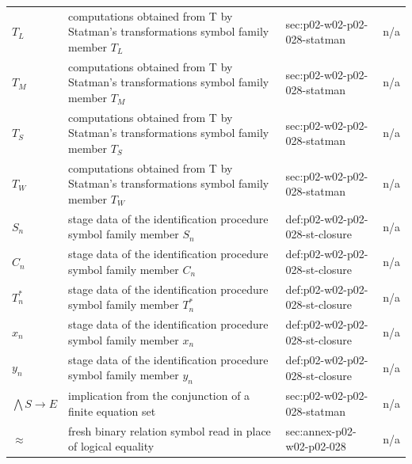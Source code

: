 \begin{longtable}{@{}p{}p{}p{}p{}@{}}
\(T_L\) & computations obtained from T by Statman's transformations symbol family member \(T_L\) & sec:\allowbreak{}p02-\allowbreak{}w02-\allowbreak{}p02-\allowbreak{}028-\allowbreak{}statman & n/a \\
\(T_M\) & computations obtained from T by Statman's transformations symbol family member \(T_M\) & sec:\allowbreak{}p02-\allowbreak{}w02-\allowbreak{}p02-\allowbreak{}028-\allowbreak{}statman & n/a \\
\(T_S\) & computations obtained from T by Statman's transformations symbol family member \(T_S\) & sec:\allowbreak{}p02-\allowbreak{}w02-\allowbreak{}p02-\allowbreak{}028-\allowbreak{}statman & n/a \\
\(T_W\) & computations obtained from T by Statman's transformations symbol family member \(T_W\) & sec:\allowbreak{}p02-\allowbreak{}w02-\allowbreak{}p02-\allowbreak{}028-\allowbreak{}statman & n/a \\
\(S_n\) & stage data of the identification procedure symbol family member \(S_n\) & def:\allowbreak{}p02-\allowbreak{}w02-\allowbreak{}p02-\allowbreak{}028-\allowbreak{}st-\allowbreak{}closure & n/a \\
\(C_n\) & stage data of the identification procedure symbol family member \(C_n\) & def:\allowbreak{}p02-\allowbreak{}w02-\allowbreak{}p02-\allowbreak{}028-\allowbreak{}st-\allowbreak{}closure & n/a \\
\(T^*_n\) & stage data of the identification procedure symbol family member \(T^*_n\) & def:\allowbreak{}p02-\allowbreak{}w02-\allowbreak{}p02-\allowbreak{}028-\allowbreak{}st-\allowbreak{}closure & n/a \\
\(x_n\) & stage data of the identification procedure symbol family member \(x_n\) & def:\allowbreak{}p02-\allowbreak{}w02-\allowbreak{}p02-\allowbreak{}028-\allowbreak{}st-\allowbreak{}closure & n/a \\
\(y_n\) & stage data of the identification procedure symbol family member \(y_n\) & def:\allowbreak{}p02-\allowbreak{}w02-\allowbreak{}p02-\allowbreak{}028-\allowbreak{}st-\allowbreak{}closure & n/a \\
\(\bigwedge S\to E\) & implication from the conjunction of a finite equation set & sec:\allowbreak{}p02-\allowbreak{}w02-\allowbreak{}p02-\allowbreak{}028-\allowbreak{}statman & n/a \\
\(\approx\) & fresh binary relation symbol read in place of logical equality & sec:\allowbreak{}annex-\allowbreak{}p02-\allowbreak{}w02-\allowbreak{}p02-\allowbreak{}028 & n/a \\

\end{longtable}
